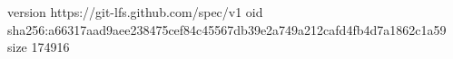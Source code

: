 version https://git-lfs.github.com/spec/v1
oid sha256:a66317aad9aee238475cef84c45567db39e2a749a212cafd4fb4d7a1862c1a59
size 174916
